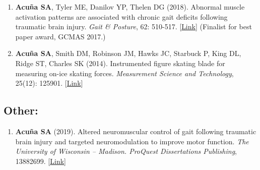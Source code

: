 \documentclass[letterpaper, 10pt]{article}
\begin{document}
\begin{enumerate}
    \item \textbf{Acuña SA}, Tyler ME, Danilov YP, Thelen DG (2018). Abnormal muscle activation patterns are associated with chronic gait deﬁcits following traumatic brain injury. \textit{Gait \& Posture}, 62: 510-517. [\href{https://www.sciencedirect.com/science/article/abs/pii/S096663621830359X}{Link}] (Finalist for best paper award, GCMAS 2017.)
    \item \textbf{Acuña SA}, Smith DM, Robinson JM, Hawks JC, Starbuck P, King DL, Ridge ST, Charles SK (2014). Instrumented ﬁgure skating blade for measuring on-ice skating forces. \textit{Measurement Science and Technology}, 25(12): 125901. [\href{https://iopscience.iop.org/article/10.1088/0957-0233/25/12/125901}{Link}]
\end{enumerate}



\subsection{Other:}
\begin{enumerate}
    \item \textbf{Acuña SA} (2019). Altered neuromuscular control of gait following traumatic brain injury and targeted neuromodulation to improve motor function. \textit{The University of Wisconsin -- Madison. ProQuest Dissertations Publishing}, 13882699. [\href{https://www.proquest.com/docview/2229834647}{Link}]
\end{enumerate}
\end{document}
